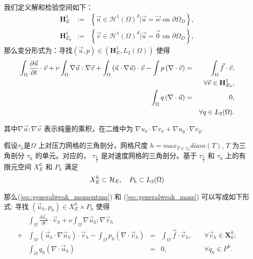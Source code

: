 \documentclass{report}
\theoremstyle{Remark}
\begin{document}
   我们定义解和检验空间如下：
   \begin{eqnarray}
     \mathbf{H}_E^1 & := & \left\{ \vec{u} \in \mathcal{H}^1(\Omega)^d \big|
       \vec{u} = \vec{w} \mbox{ on } \partial \Omega_D \right\},\\
     \mathbf{H}_{E_0}^1 & := & \left\{ \vec{v} \in \mathcal{H}^1(\Omega)^d \big|
       \vec{u} = \vec{0} \mbox{ on } \partial \Omega_D \right\},
   \end{eqnarray}
   那么变分形式为：寻找$(\vec{u}, p) \in (\mathbf{H}_E^1,
   L_2(\Omega))$ 使得
   \begin{eqnarray}
     \int_{\Omega}\frac{\partial \vec{u}}{\partial t} \cdot \vec{v} + 
     \nu \int_\Omega \nabla \vec{u} : \nabla \vec{v} + \int_\Omega \left(
       \vec{u} \cdot \nabla \vec{u} \right) \cdot \vec{v} - \int p
     \left( \nabla \cdot \vec{v} \right) & = & \int_\Omega \vec{f} \cdot
     \vec{v}, \label{eq::generalweak_momentum}\\
     & & \forall \vec{v} \in \mathbf{H}_{E_0}^1,\notag \\
     \int_\Omega q \left( \nabla \cdot \vec{u} \right) & = & 0,
     \label{eq::generalweak_mass} \\
     & & \forall q \in L_2(\Omega). \notag
   \end{eqnarray}

   其中$\nabla \vec{u} : \nabla \vec{v}$ 表示纯量的乘积，在二维中为
   $\nabla u_x \cdot \nabla v_x + \nabla u_y \cdot \nabla v_y$.

   假设$\tau_h$是$\Omega$ 上对压力网格的三角剖分，网格尺度 $h = max_{T
     \in \tau_h} diam(T)$, $T$ 为三角剖分 $\tau_h$ 的单元。对应的，
   $\tau_{\frac{h}{2}}$ 是对速度网格的三角剖分。基于
   $\tau_{\frac{h}{2}}$ 和 $\tau_{h}$ 上的有限元空间 $X_E^h$ 和 $P_h$
   满足 
   \begin{equation}
     X_E^h \subset \mathcal{H}_E, \quad P_h \subset L_2(\Omega) 
     \notag 
   \end{equation}
  
   那么(\ref{eq::generalweak_momentum}) 和 (\ref{eq::generalweak_mass})
   可以写成如下形式: 寻找 $(\vec{u}_h, p_h) \in X_E^h \times P_h$ 使得
   \begin{equation}
     \begin{aligned}
       &\int_{\Omega}\frac{\partial \vec{u}_h}{\partial t} \cdot \vec{v}_h
       + \nu \int_\Omega \nabla \vec{u}_h : \nabla \vec{v}_h  \\
       + & \int_\Omega \left( \vec{u}_h \cdot \nabla \vec{u}_h \right)
       \cdot \vec{v}_h - \int_\Omega p_h \left( \nabla \cdot \vec{v}_h
       \right) & = &\int_\Omega \vec{f} \cdot \vec{v}_h, &\quad
       \forall \vec{v}_h \in \mathbf{X}_0^h;  \\
       & \int_\Omega q_h \left( \nabla \cdot \vec{u}_h \right) & = &0,&
       \quad \forall q_h \in P^h.
       \label{eq::discreted_weak}
     \end{aligned}
   \end{equation}
\end{document}
